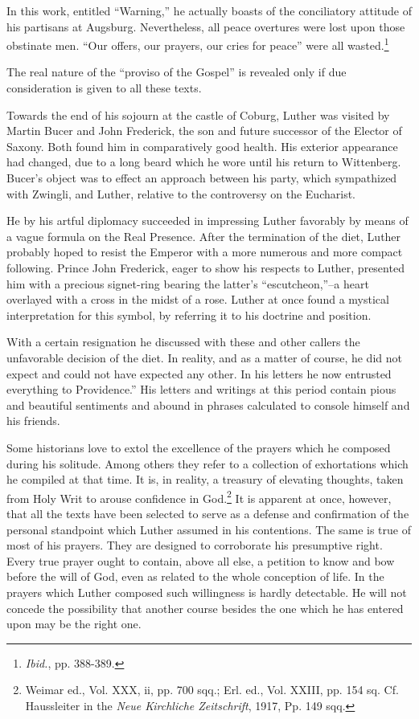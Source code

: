 In this work, entitled “Warning,”
he actually boasts of the conciliatory attitude of his partisans at Augsburg.
Nevertheless, all peace overtures were lost upon those obstinate
men. “Our offers, our prayers, our cries for peace” were all wasted.\footnote{\textit{Ibid.}, pp. 388-389.}


The real nature of the “proviso of the Gospel” is revealed only if
due consideration is given to all these texts.

Towards the end of his sojourn at the castle of Coburg, Luther was
visited by Martin Bucer and John Frederick, the son and future
successor of the Elector of Saxony. Both found him in comparatively
good health. His exterior appearance had changed, due to a long
beard which he wore until his return to Wittenberg. Bucer’s object
was to effect an approach between his party, which sympathized with
Zwingli, and Luther, relative to the controversy on the Eucharist.

He by his artful diplomacy succeeded in impressing Luther
favorably by means of a vague formula on the Real Presence. After
the termination of the diet, Luther probably hoped to resist the Emperor
with a more numerous and more compact following. Prince
John Frederick, eager to show his respects to Luther, presented him
with a precious signet-ring bearing the latter’s “escutcheon,”--a
heart overlayed with a cross in the midst of a rose. Luther at once
found a mystical interpretation for this symbol, by referring it to
his doctrine and position.

With a certain resignation he discussed with these and other callers
the unfavorable decision of the diet. In reality, and as a matter of
course, he did not expect and could not have expected any other.
In his letters he now entrusted everything to Providence.”
His letters and writings at this period contain pious and beautiful sentiments
and abound in phrases calculated to console himself and his friends.

Some historians love to extol the excellence of the prayers which he
composed during his solitude. Among others they refer to a collection
of exhortations which he compiled at that time. It is, in reality, a
treasury of elevating thoughts, taken from Holy Writ to arouse confidence
in God.\footnote
{Weimar ed., Vol. XXX, ii, pp. 700 sqq.; Erl. ed., Vol. XXIII, pp. 154 sq. Cf. Haussleiter
in the \textit{Neue Kirchliche Zeitschrift}, 1917, Pp. 149 sqq.}
It is apparent at once, however, that all the texts
have been selected to serve as a defense and confirmation of the personal
standpoint which Luther assumed in his contentions. The same
is true of most of his prayers. They are designed to corroborate his
presumptive right. Every true prayer ought to contain, above all
else, a petition to know and bow before the will of God, even as related
to the whole conception of life. In the prayers which Luther
composed such willingness is hardly detectable. He will not concede
the possibility that another course besides the one which he has entered
upon may be the right one.

